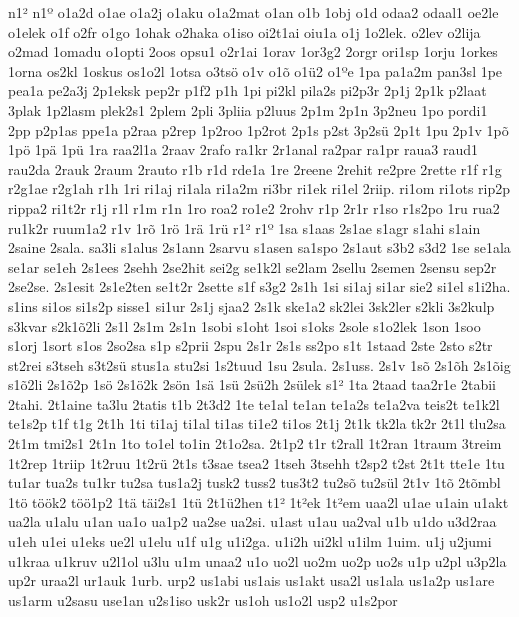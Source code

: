 {n1^^b2
n1^^ba
o1a2d
o1ae
o1a2j
o1aku
o1a2mat
o1an
o1b
1obj
o1d
odaa2
odaal1
oe2le
o1elek
o1f
o2fr
o1go
1ohak
o2haka
o1iso
oi2t1ai
oiu1a
o1j
1o2lek.
o2lev
o2lija
o2mad
1omadu
o1opti
2oos
opsu1
o2r1ai
1orav
1or3g2
2orgr
ori1sp
1orju
1orkes
1orna
os2kl
1oskus
os1o2l
1otsa
o3ts^^f6
o1v
o1^^f5
o1^^fc2
o1^^bae
1pa
pa1a2m
pan3sl
1pe
pea1a
pe2a3j
2p1eksk
pep2r
p1f2
p1h
1pi
pi2kl
pila2s
pi2p3r
2p1j
2p1k
p2laat
3plak
1p2lasm
plek2s1
2plem
2pli
3pliia
p2luus
2p1m
2p1n
3p2neu
1po
pordi1
2pp
p2p1as
ppe1a
p2raa
p2rep
1p2roo
1p2rot
2p1s
p2st
3p2s^^fc
2p1t
1pu
2p1v
1p^^f5
1p^^f6
1p^^e4
1p^^fc
1ra
raa2l1a
2raav
2rafo
ra1kr
2r1anal
ra2par
ra1pr
raua3
raud1
rau2da
2rauk
2raum
2rauto
r1b
r1d
rde1a
1re
2reene
2rehit
re2pre
2rette
r1f
r1g
r2g1ae
r2g1ah
r1h
1ri
ri1aj
ri1ala
ri1a2m
ri3br
ri1ek
ri1el
2riip.
ri1om
ri1ots
rip2p
rippa2
ri1t2r
r1j
r1l
r1m
r1n
1ro
roa2
ro1e2
2rohv
r1p
2r1r
r1so
r1s2po
1ru
rua2
ru1k2r
ruum1a2
r1v
1r^^f5
1r^^f6
1r^^e4
1r^^fc
r1^^b2
r1^^ba
1sa
s1aas
2s1ae
s1agr
s1ahi
s1ain
2saine
2sala.
sa3li
s1alus
2s1ann
2sarvu
s1asen
sa1spo
2s1aut
s3b2
s3d2
1se
se1ala
se1ar
se1eh
2s1ees
2sehh
2se2hit
sei2g
se1k2l
se2lam
2sellu
2semen
2sensu
sep2r
2se2se.
2s1esit
2s1e2ten
se1t2r
2sette
s1f
s3g2
2s1h
1si
si1aj
si1ar
sie2
si1el
s1i2ha.
s1ins
si1os
si1s2p
sisse1
si1ur
2s1j
sjaa2
2s1k
ske1a2
sk2lei
3sk2ler
s2kli
3s2kulp
s3kvar
s2k1^^f52li
2s1l
2s1m
2s1n
1sobi
s1oht
1soi
s1oks
2sole
s1o2lek
1son
1soo
s1orj
1sort
s1os
2so2sa
s1p
s2prii
2spu
2s1r
2s1s
ss2po
s1t
1staad
2ste
2sto
s2tr
st2rei
s3tseh
s3t2s^^fc
stus1a
stu2si
1s2tuud
1su
2sula.
2s1uss.
2s1v
1s^^f5
2s1^^f5h
2s1^^f5ig
s1^^f52li
2s1^^f52p
1s^^f6
2s1^^f62k
2s^^f6n
1s^^e4
1s^^fc
2s^^fc2h
2s^^fclek
s1^^b2
1ta
2taad
taa2r1e
2tabii
2tahi.
2t1aine
ta3lu
2tatis
t1b
2t3d2
1te
te1al
te1an
te1a2s
te1a2va
teis2t
te1k2l
te1s2p
t1f
t1g
2t1h
1ti
ti1aj
ti1al
ti1as
ti1e2
ti1os
2t1j
2t1k
tk2la
tk2r
2t1l
tlu2sa
2t1m
tmi2s1
2t1n
1to
to1el
to1in
2t1o2sa.
2t1p2
t1r
t2rall
1t2ran
1traum
3treim
1t2rep
1triip
1t2ruu
1t2r^^fc
2t1s
t3sae
tsea2
1tseh
3tsehh
t2sp2
t2st
2t1t
tte1e
1tu
tu1ar
tua2s
tu1kr
tu2sa
tus1a2j
tusk2
tuss2
tus3t2
tu2s^^f5
tu2s^^fcl
2t1v
1t^^f5
2t^^f5mbl
1t^^f6
t^^f6^^f6k2
t^^f6^^f61p2
1t^^e4
t^^e4i2s1
1t^^fc
2t1^^fc2hen
t1^^b2
1t^^b2ek
1t^^b2em
uaa2l
u1ae
u1ain
u1akt
ua2la
u1alu
u1an
ua1o
ua1p2
ua2se
ua2si.
u1ast
u1au
ua2val
u1b
u1do
u3d2raa
u1eh
u1ei
u1eks
ue2l
u1elu
u1f
u1g
u1i2ga.
u1i2h
ui2kl
u1ilm
1uim.
u1j
u2jumi
u1kraa
u1kruv
u2l1ol
u3lu
u1m
unaa2
u1o
uo2l
uo2m
uo2p
uo2s
u1p
u2pl
u3p2la
up2r
uraa2l
ur1auk
1urb.
urp2
us1abi
us1ais
us1akt
usa2l
us1ala
us1a2p
us1are
us1arm
u2sasu
use1an
u2s1iso
usk2r
us1oh
us1o2l
usp2
u1s2por
}

